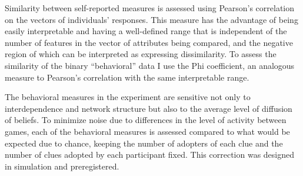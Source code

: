 \documentclass[9pt,twocolumn,twoside,lineno]{pnas-new}
\begin{document}
{  


Similarity between self-reported measures is assessed using Pearson’s correlation on the vectors of individuals’ responses. This measure has the advantage of being easily interpretable and having a well-defined range that is independent of the number of features in the vector of attributes being compared, and the negative region of which can be interpreted as expressing dissimilarity. To assess the similarity of the binary “behavioral” data I use the Phi coefficient, an analogous measure to Pearson’s correlation with the same interpretable range.

The behavioral measures in the experiment are sensitive not only to interdependence and network structure but also to the average level of diffusion of beliefs. To minimize noise due to differences in the level of activity between games, each of the behavioral measures is assessed compared to what would be expected due to chance, keeping the number of adopters of each clue and the number of clues adopted by each participant fixed. This correction was designed in simulation and preregistered.
}

\showmatmethods{} %



\end{document}
